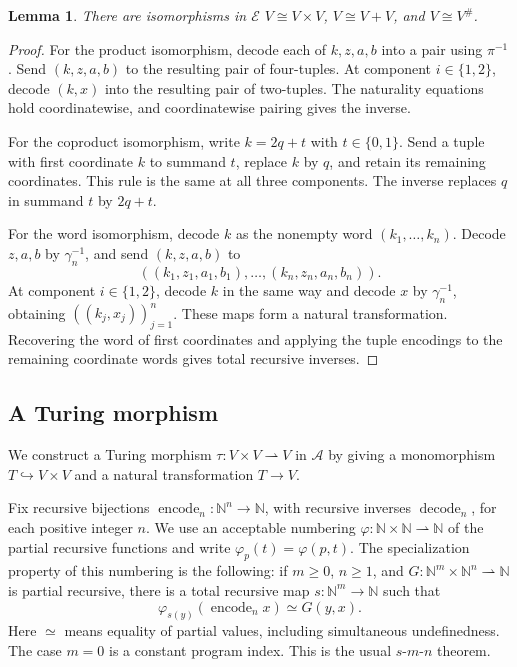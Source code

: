 \documentclass[11pt]{article}
\newtheorem{lemma}[theorem]{Lemma}
\newcommand{\N}{\mathbb N}
\begin{document}
\begin{lemma}\label{lem:fork-frames}
There are isomorphisms in $\mathcal E$
$V\cong V\times V$, $V\cong V+V$, and $V\cong V^\#$.
\end{lemma}
\begin{proof}
For the product isomorphism, decode each of $k,z,a,b$ into a
pair using $\pi^{-1}$. Send $(k,z,a,b)$ to the resulting pair
of four-tuples. At component $i\in\{1,2\}$, decode $(k,x)$ into
the resulting pair of two-tuples. The naturality equations hold
coordinatewise, and coordinatewise pairing gives the inverse.

For the coproduct isomorphism, write $k=2q+t$ with
$t\in\{0,1\}$. Send a tuple with first coordinate $k$ to
summand $t$, replace $k$ by $q$, and retain its remaining
coordinates. This rule is the same at all three components.
The inverse replaces $q$ in summand $t$ by $2q+t$.

For the word isomorphism, decode $k$ as the nonempty word
$(k_1,\ldots,k_n)$. Decode $z,a,b$ by $\gamma_n^{-1}$,
and send $(k,z,a,b)$ to
\[
 ((k_1,z_1,a_1,b_1),\ldots,(k_n,z_n,a_n,b_n)).
\]
At component $i\in\{1,2\}$, decode $k$ in the same way and
decode $x$ by $\gamma_n^{-1}$, obtaining $((k_j,x_j))_{j=1}^n$.
These maps form a natural transformation. Recovering the word of
first coordinates and applying the tuple encodings to the
remaining coordinate words gives total recursive inverses.
\end{proof}

\subsection{A Turing morphism}\label{app:fork-turing}

We construct a Turing morphism $\tau:V\times V\rightharpoonup V$
in $\mathcal A$ by giving a monomorphism $T\hookrightarrow V\times V$
and a natural transformation $T\to V$.

Fix recursive bijections
$\operatorname{encode}_n:\N^n\to\N$, with recursive inverses
$\operatorname{decode}_n$, for each positive integer $n$.
We use an acceptable numbering
$\varphi:\N\times\N\rightharpoonup\N$ of the partial recursive
functions and write $\varphi_p(t)=\varphi(p,t)$.
The specialization property of this numbering is the following:
if $m\geq0$, $n\geq1$, and
$G:\N^m\times\N^n\rightharpoonup\N$ is partial recursive,
there is a total recursive map $s:\N^m\to\N$ such that
\[
 \varphi_{s(y)}(\operatorname{encode}_n x)\simeq G(y,x).
\]
Here $\simeq$ means equality of partial values,
including simultaneous undefinedness. The case $m=0$ is a
constant program index. This is the usual $s$-$m$-$n$ theorem.
\end{document}
